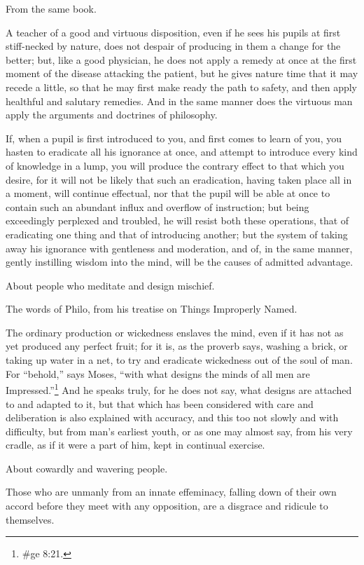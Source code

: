 From the same book.

A teacher of a good and virtuous disposition, even if he sees his pupils at first stiff-necked by
nature, does not despair of producing in them a change for the better; but, like a good physician,
he does not apply a remedy at once at the first moment of the disease attacking the patient, but he
gives nature time that it may recede a little, so that he may first make ready the path to safety, and
then apply healthful and salutary remedies. And in the same manner does the virtuous man apply
the arguments and doctrines of philosophy.

If, when a pupil is first introduced to you, and first comes to learn of you, you hasten to eradicate all
his ignorance at once, and attempt to introduce every kind of knowledge in a lump, you will produce
the contrary effect to that which you desire, for it will not be likely that such an eradication, having
taken place all in a moment, will continue effectual, nor that the pupil will be able at once to contain
such an abundant influx and overflow of instruction; but being exceedingly perplexed and troubled,
he will resist both these operations, that of eradicating one thing and that of introducing another;
but the system of taking away his ignorance with gentleness and moderation, and of, in the same
manner, gently instilling wisdom into the mind, will be the causes of admitted advantage.

About people who meditate and design mischief.

The words of Philo, from his treatise on Things Improperly Named.

The ordinary production or wickedness enslaves the mind, even if it has not as yet produced any
perfect fruit; for it is, as the proverb says, washing a brick, or taking up water in a net, to try and
eradicate wickedness out of the soul of man. For ``behold,'' says Moses, ``with what designs the
minds of all men are Impressed.''\footnote{\#ge 8:21.} And he speaks truly, for he does not say, what
designs are attached to and adapted to it, but that which has been considered with care and
deliberation is also explained with accuracy, and this too not slowly and with difficulty, but from
man's earliest youth, or as one may almost say, from his very cradle, as if it were a part of him,
kept in continual exercise.

About cowardly and wavering people.

Those who are unmanly from an innate effeminacy, falling down of their own accord before they
meet with any opposition, are a disgrace and ridicule to themselves.

